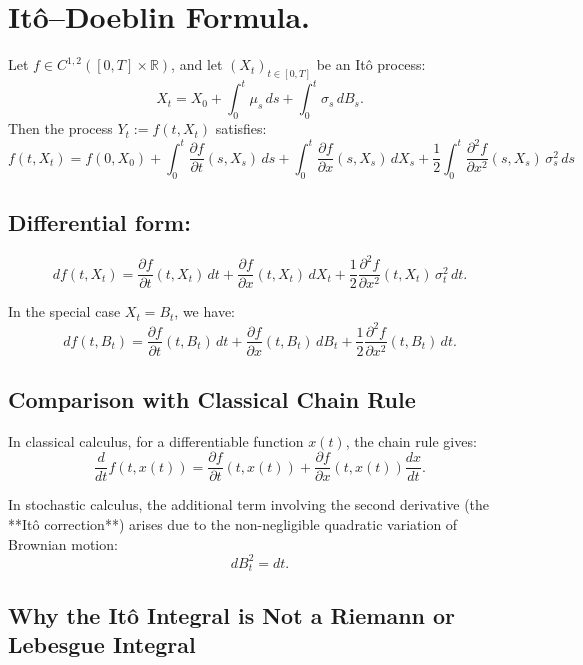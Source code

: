 
\section{Itô–Doeblin Formula.}  
Let \( f \in C^{1,2}([0,T] \times \mathbb{R}) \), and let \( (X_t)_{t \in [0,T]} \) be an Itô process:
\[
X_t = X_0 + \int_0^t \mu_s \, ds + \int_0^t \sigma_s \, dB_s.
\]
Then the process \( Y_t := f(t, X_t) \) satisfies:
\[
\boxed{
f(t, X_t) = f(0, X_0) + \int_0^t \frac{\partial f}{\partial t}(s, X_s) \, ds
+ \int_0^t \frac{\partial f}{\partial x}(s, X_s) \, dX_s
+ \frac{1}{2} \int_0^t \frac{\partial^2 f}{\partial x^2}(s, X_s) \, \sigma_s^2 \, ds
}
\]

\subsection{Differential form:}
\[
df(t, X_t) = \frac{\partial f}{\partial t}(t, X_t) \, dt
+ \frac{\partial f}{\partial x}(t, X_t) \, dX_t
+ \frac{1}{2} \frac{\partial^2 f}{\partial x^2}(t, X_t) \, \sigma_t^2 \, dt.
\]

In the special case \( X_t = B_t \), we have:
\[
df(t, B_t) = \frac{\partial f}{\partial t}(t, B_t) \, dt
+ \frac{\partial f}{\partial x}(t, B_t) \, dB_t
+ \frac{1}{2} \frac{\partial^2 f}{\partial x^2}(t, B_t) \, dt.
\]

\vspace{1em}
\subsection{Comparison with Classical Chain Rule}

In classical calculus, for a differentiable function \( x(t) \), the chain rule gives:
\[
\frac{d}{dt} f(t, x(t)) = \frac{\partial f}{\partial t}(t, x(t)) + \frac{\partial f}{\partial x}(t, x(t)) \frac{dx}{dt}.
\]

In stochastic calculus, the additional term involving the second derivative (the **Itô correction**) arises due to the non-negligible quadratic variation of Brownian motion:
\[
dB_t^2 = dt.
\]

\vspace{1em}
\subsection{Why the Itô Integral is Not a Riemann or Lebesgue Integral}


